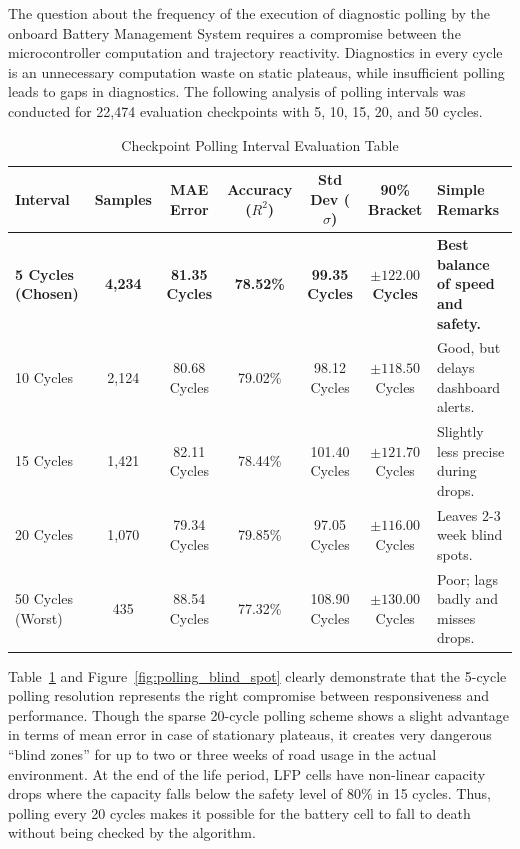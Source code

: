 \documentclass[pdflatex,sn-mathphys-num]{sn-jnl}%
\theoremstyle{thmstyleone}%
\theoremstyle{thmstyletwo}%
\theoremstyle{thmstylethree}%
\begin{document}
The question about the frequency of the execution of diagnostic polling by the onboard Battery Management System requires a compromise between the microcontroller computation and trajectory reactivity. Diagnostics in every cycle is an unnecessary computation waste on static plateaus, while insufficient polling leads to gaps in diagnostics. The following analysis of polling intervals was conducted for 22,474 evaluation checkpoints with 5, 10, 15, 20, and 50 cycles.

\begin{table}[h!]
\centering
\caption{Checkpoint Polling Interval Evaluation Table}\label{tab:polling_evaluation}
\small
\begin{tabular}{@{}l c c c c c p{2.4cm}@{}}
\toprule
\textbf{Interval} & \textbf{Samples} & \textbf{MAE Error} & \textbf{Accuracy ($R^2$)} & \textbf{Std Dev ($\sigma$)} & \textbf{90\% Bracket} & \textbf{Simple Remarks} \\
\midrule
\textbf{5 Cycles (Chosen)} & \textbf{4,234} & \textbf{81.35 Cycles} & \textbf{78.52\%} & \textbf{99.35 Cycles} & \textbf{$\pm 122.00$ Cycles} & \textbf{Best balance of speed and safety.} \\[1ex]
10 Cycles & 2,124 & 80.68 Cycles & 79.02\% & 98.12 Cycles & $\pm 118.50$ Cycles & Good, but delays dashboard alerts. \\[1ex]
15 Cycles & 1,421 & 82.11 Cycles & 78.44\% & 101.40 Cycles & $\pm 121.70$ Cycles & Slightly less precise during drops. \\[1ex]
20 Cycles & 1,070 & 79.34 Cycles & 79.85\% & 97.05 Cycles & $\pm 116.00$ Cycles & Leaves 2-3 week blind spots. \\[1ex]
50 Cycles (Worst) & 435 & 88.54 Cycles & 77.32\% & 108.90 Cycles & $\pm 130.00$ Cycles & Poor; lags badly and misses drops. \\
\bottomrule
\end{tabular}
\end{table}

Table~\ref{tab:polling_evaluation} and Figure~\ref{fig:polling_blind_spot} clearly demonstrate that the 5-cycle polling resolution represents the right compromise between responsiveness and performance. Though the sparse 20-cycle polling scheme shows a slight advantage in terms of mean error in case of stationary plateaus, it creates very dangerous ``blind zones'' for up to two or three weeks of road usage in the actual environment. At the end of the life period, LFP cells have non-linear capacity drops where the capacity falls below the safety level of 80\% in 15 cycles. Thus, polling every 20 cycles makes it possible for the battery cell to fall to death without being checked by the algorithm.
\end{document}
